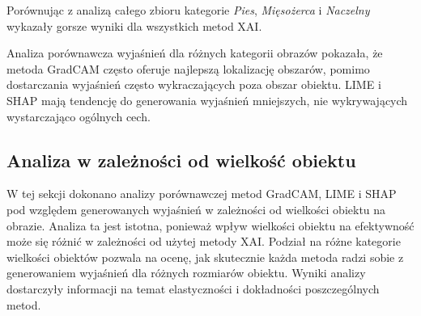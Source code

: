 Porównując z analizą całego zbioru kategorie \textit{Pies}, \textit{Mięsożerca} i \textit{Naczelny} wykazały gorsze wyniki dla wszystkich metod XAI.

\vspace{1cm}

Analiza porównawcza wyjaśnień dla różnych kategorii obrazów pokazała, że metoda GradCAM często oferuje najlepszą lokalizację obszarów, pomimo dostarczania wyjaśnień często wykraczających poza obszar obiektu.
LIME i SHAP mają tendencję do generowania wyjaśnień mniejszych, nie wykrywających wystarczająco ogólnych cech.

\subsection*{Analiza w zależności od wielkość obiektu}

W tej sekcji dokonano analizy porównawczej metod GradCAM, LIME i SHAP pod względem generowanych wyjaśnień w zależności od wielkości obiektu na obrazie.
Analiza ta jest istotna, ponieważ wpływ wielkości obiektu na efektywność może się różnić w zależności od użytej metody XAI.
Podział na różne kategorie wielkości obiektów pozwala na ocenę, jak skutecznie każda metoda radzi sobie z generowaniem wyjaśnień dla różnych rozmiarów obiektu.
Wyniki analizy dostarczyły informacji na temat elastyczności i dokładności poszczególnych metod.


